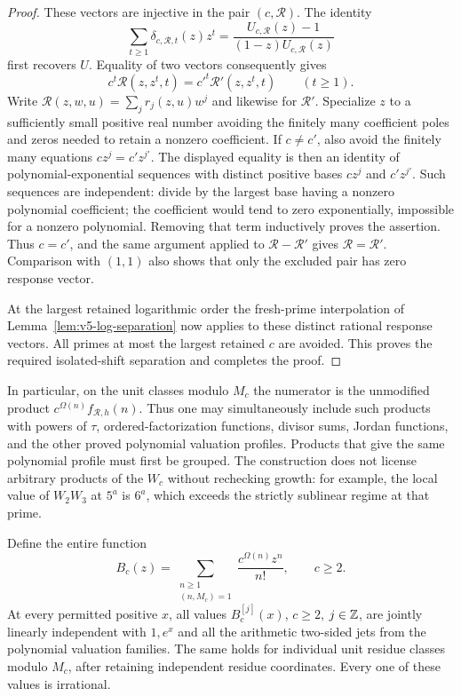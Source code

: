 \begin{proof}
These vectors are injective in the pair $(c,\mathcal R)$.
The identity
\[
 \sum_{t\geq1}\delta_{c,\mathcal R,t}(z)z^t
  =\frac{U_{c,\mathcal R}(z)-1}
         {(1-z)U_{c,\mathcal R}(z)}
\]
first recovers $U$.  Equality of two vectors consequently gives
\[
 c^t\mathcal R(z,z^t,t)
   ={c'}^t\mathcal R'(z,z^t,t)\qquad(t\geq1).
\]
Write $\mathcal R(z,w,u)=\sum_j r_j(z,u)w^j$ and likewise for
$\mathcal R'$.  Specialize $z$ to a sufficiently small positive real
number avoiding the finitely many coefficient poles and zeros needed
to retain a nonzero coefficient.  If $c\ne c'$, also avoid the finitely
many equations $cz^j=c'z^{j'}$.  The displayed equality is then an
identity of polynomial-exponential sequences with distinct positive
bases $cz^j$ and $c'z^{j'}$.  Such sequences are independent: divide
by the largest base having a nonzero polynomial coefficient; the
coefficient would tend to zero exponentially, impossible for a nonzero
polynomial.  Removing that term inductively proves the assertion.
Thus $c=c'$, and the same argument applied to $\mathcal R-\mathcal R'$
gives $\mathcal R=\mathcal R'$.  Comparison with $(1,1)$ also shows
that only the excluded pair has zero response vector.

At the largest retained logarithmic order the fresh-prime interpolation
of Lemma~\ref{lem:v5-log-separation} now applies to these distinct
rational response vectors.  All primes at most the largest retained
$c$ are avoided.  This proves the required isolated-shift separation
and completes the proof.
\end{proof}

In particular, on the unit classes modulo $M_c$ the numerator is the
unmodified product $c^{\Omega(n)}f_{\mathcal R,h}(n)$.
Thus one may simultaneously include such products with powers of
$\tau$, ordered-factorization functions, divisor sums, Jordan functions,
and the other proved polynomial valuation profiles.  Products that give
the same polynomial profile must first be grouped.  The construction
does not license arbitrary products of the $W_c$ without rechecking
growth: for example, the local value of $W_2W_3$ at $5^a$ is $6^a$,
which exceeds the strictly sublinear regime at that prime.

\begin{corollary}
\label{cor:v5-ordinary-omega}
Define the entire function
\[
 B_c(z)=\sum_{\substack{n\geq1\\(n,M_c)=1}}
              \frac{c^{\Omega(n)}z^n}{n!},\qquad c\geq2.
\]
At every permitted positive $x$, all values $B_c^{[j]}(x)$,
$c\geq2$, $j\in\mathbb Z$, are jointly linearly independent with $1,e^x$
and all the arithmetic two-sided jets from the polynomial valuation
families.  The same holds for individual unit residue classes modulo
$M_c$, after retaining independent residue coordinates.  Every one
of these values is irrational.
\end{corollary}

